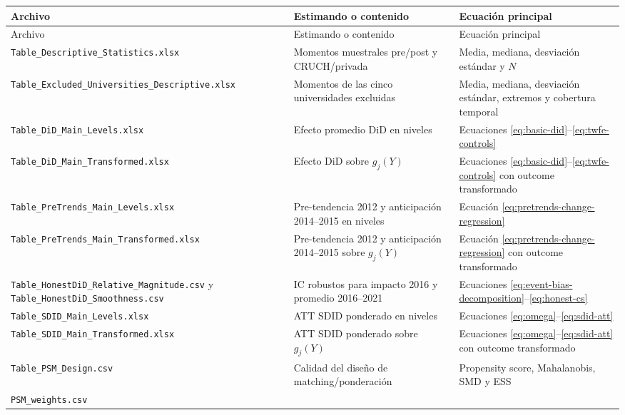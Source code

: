 \documentclass[11pt]{article}
\newcommand{\file}[1]{\texttt{#1}}
\begin{document}
\begin{longtable}{>{\raggedright\arraybackslash}p{}
                  >{\raggedright\arraybackslash}p{}
                  >{\raggedright\arraybackslash}p{}}
\toprule
Archivo & Estimando o contenido & Ecuación principal \\
\midrule
\endfirsthead
\toprule
Archivo & Estimando o contenido & Ecuación principal \\
\midrule
\endhead
\file{Table\_Descriptive\_Statistics.xlsx}
& Momentos muestrales pre/post y CRUCH/privada
& Media, mediana, desviación estándar y $N$ \\
\addlinespace
\file{Table\_Excluded\_Universities\_Descriptive.xlsx}
& Momentos de las cinco universidades excluidas
& Media, mediana, desviación estándar, extremos y cobertura temporal \\
\addlinespace
\file{Table\_DiD\_Main\_Levels.xlsx}
& Efecto promedio DiD en niveles
& Ecuaciones \eqref{eq:basic-did}--\eqref{eq:twfe-controls} \\
\addlinespace
\file{Table\_DiD\_Main\_Transformed.xlsx}
& Efecto DiD sobre $g_j(Y)$
& Ecuaciones \eqref{eq:basic-did}--\eqref{eq:twfe-controls} con outcome transformado \\
\addlinespace
\file{Table\_PreTrends\_Main\_Levels.xlsx}
& Pre-tendencia 2012 y anticipación 2014--2015 en niveles
& Ecuación \eqref{eq:pretrends-change-regression} \\
\addlinespace
\file{Table\_PreTrends\_Main\_Transformed.xlsx}
& Pre-tendencia 2012 y anticipación 2014--2015 sobre $g_j(Y)$
& Ecuación \eqref{eq:pretrends-change-regression} con outcome transformado \\
\addlinespace
\file{Table\_HonestDiD\_Relative\_Magnitude.csv} y
\file{Table\_HonestDiD\_Smoothness.csv}
& IC robustos para impacto 2016 y promedio 2016--2021
& Ecuaciones \eqref{eq:event-bias-decomposition}--\eqref{eq:honest-cs} \\
\addlinespace
\file{Table\_SDID\_Main\_Levels.xlsx}
& ATT SDID ponderado en niveles
& Ecuaciones \eqref{eq:omega}--\eqref{eq:sdid-att} \\
\addlinespace
\file{Table\_SDID\_Main\_Transformed.xlsx}
& ATT SDID ponderado sobre $g_j(Y)$
& Ecuaciones \eqref{eq:omega}--\eqref{eq:sdid-att} con outcome transformado \\
\addlinespace
\file{Table\_PSM\_Design.csv}
& Calidad del diseño de matching/ponderación
& Propensity score, Mahalanobis, SMD y ESS \\
\addlinespace
\file{PSM\_weights.csv}

\end{longtable}
\end{document}
